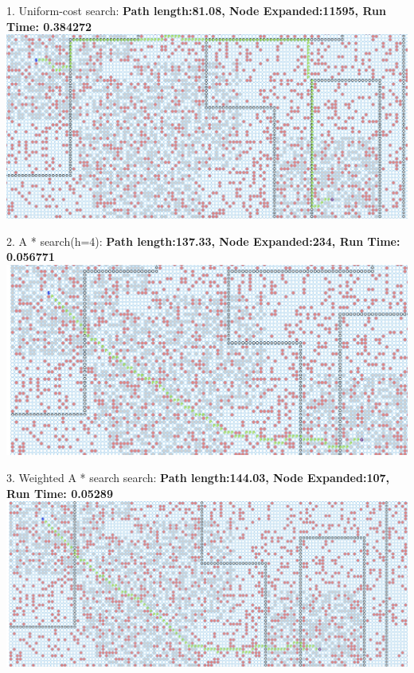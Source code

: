 \documentclass[12pt, letterpaper]{article}
\begin{document}
1. Uniform-cost search:\newline
\medskip
\textbf{Path length:81.08, Node Expanded:11595,	Run Time: 0.384272}\newline
\noindent \includegraphics[scale=0.2]{"b-map5-1-u"}\newline

2. A * search(h=4): \newline
\medskip
\textbf{Path length:137.33, Node Expanded:234,	Run Time: 0.056771}\newline
\noindent \includegraphics[scale=0.2]{"b-map5-1-a"}\newline

3. Weighted A * search search:\newline
\medskip
\textbf{Path length:144.03, Node Expanded:107,	Run Time: 0.05289}\newline
\noindent \includegraphics[scale=0.2]{"b-map5-1-w-2"}\newline
\end{document}
